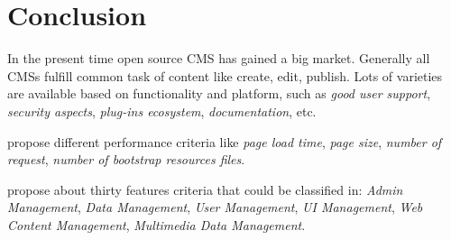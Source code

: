 \section{Conclusion}

In the present time open source CMS has gained a big market. 
Generally all CMSs fulfill common task of content like create, edit, publish. 
Lots of varieties are available based on functionality and platform, such as \emph{good user support}, \emph{security aspects}, \emph{plug-ins ecosystem}, \emph{documentation}, etc.

\cite{6169111} propose different performance criteria like \emph{page load time}, \emph{page size}, \emph{number of request}, \emph{number of bootstrap resources files}.
 
\cite{5552271} propose about thirty features criteria that could be classified in: \emph{Admin Management}, \emph{Data Management}, \emph{User Management}, \emph{UI Management}, \emph{Web Content Management}, \emph{Multimedia Data Management}.
